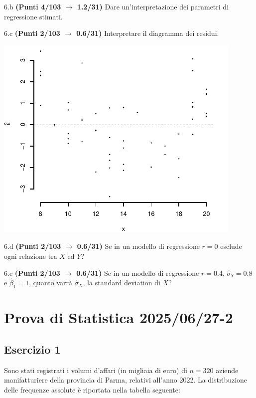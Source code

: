 \documentclass[
  11pt,
]{book}
\theoremstyle{mytheoremstyle}
\theoremstyle{mydefstyle}
\begin{document}
6.b \textbf{(Punti 4/103 \(\rightarrow\) 1.2/31)} Dare un'interpretazione dei parametri di regressione stimati.

6.c \textbf{(Punti 2/103 \(\rightarrow\) 0.6/31)} Interpretare il diagramma dei residui.

\begin{center}\includegraphics{Esami_passati_con_soluzioni_files/figure-latex/unnamed-chunk-69-1} \end{center}

6.d \textbf{(Punti 2/103 \(\rightarrow\) 0.6/31)} Se in un modello di regressione \(r=0\) esclude ogni relazione tra \(X\) ed \(Y\)?

6.e \textbf{(Punti 2/103 \(\rightarrow\) 0.6/31)} Se in un modello di regressione \(r=0.4\), \(\hat\sigma_Y=0.8\) e \(\hat\beta_1=1\), quanto varrà
\(\hat\sigma_X\), la standard deviation di \(X\)?

\section{Prova di Statistica 2025/06/27-2}\label{prova-di-statistica-20250627-2}

\subsection{Esercizio 1}\label{esercizio-1-47}

Sono stati registrati i volumi d'affari (in migliaia di euro) di \(n = 320\) aziende manifatturiere della provincia di Parma, relativi all'anno 2022. La distribuzione delle frequenze assolute è riportata nella tabella seguente:
\end{document}
